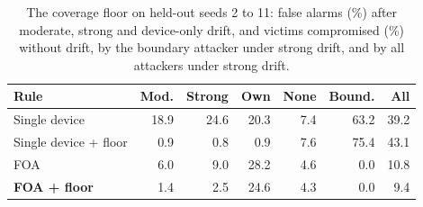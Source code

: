 \begin{table}[t]
\centering
\caption{The coverage floor on held-out seeds 2 to 11: false alarms (\%) after moderate, strong and device-only drift, and victims compromised (\%) without drift, by the boundary attacker under strong drift, and by all attackers under strong drift.}
\label{tab:floor}
\small
\setlength{\tabcolsep}{3pt}
\begin{tabular}{@{}lrrrrrr@{}}
\toprule
Rule & Mod. & Strong & Own & None & Bound. & All \\
\midrule
Single device & 18.9 & 24.6 & 20.3 & 7.4 & 63.2 & 39.2 \\
Single device + floor & 0.9 & 0.8 & 0.9 & 7.6 & 75.4 & 43.1 \\
FOA & 6.0 & 9.0 & 28.2 & 4.6 & 0.0 & 10.8 \\
\textbf{FOA + floor} & 1.4 & 2.5 & 24.6 & 4.3 & 0.0 & 9.4 \\
\bottomrule
\end{tabular}
\end{table}
